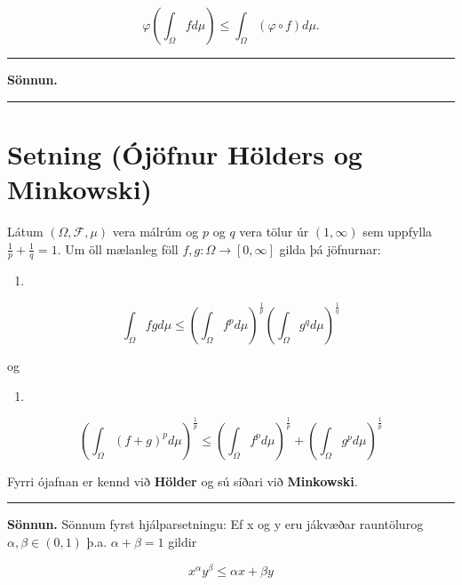 \documentclass[]{book}
\begin{document}
\[
\varphi\left(\int_\Omega fd\mu\right) \leq \int_\Omega (\varphi\circ f)d\mu.
\]

\begin{center}\rule{0.5\linewidth}{\linethickness}\end{center}

\textbf{Sönnun.}

\begin{center}\rule{0.5\linewidth}{\linethickness}\end{center}

\hypertarget{setning-ojofnur-holders-og-minkowski}{%
\section*{Setning (Ójöfnur Hölders og Minkowski)}\label{setning-ojofnur-holders-og-minkowski}}

Látum \((\Omega,\mathcal F,\mu)\) vera málrúm og \(p\) og \(q\) vera tölur úr \((1,\infty)\) sem uppfylla \(\frac1p + \frac1q = 1\). Um öll mælanleg föll \(f,g:\Omega\rightarrow[0,\infty]\) gilda þá jöfnurnar:

\begin{enumerate}
\def\labelenumi{\arabic{enumi}.}
\item
\end{enumerate}

\[
\int_\Omega fgd\mu \leq \left(\int_\Omega f^pd\mu\right)^{\frac1p}\left(\int_\Omega g^qd\mu\right)^{\frac1q}
\]

og

\begin{enumerate}
\def\labelenumi{\arabic{enumi}.}
\setcounter{enumi}{1}
\item
\end{enumerate}

\[
\left(\int_\Omega (f+g)^pd\mu\right)^\frac1p \leq
\left(\int_\Omega f^pd\mu\right)^{\frac1p} +
\left(\int_\Omega g^pd\mu\right)^{\frac1p}
\]

Fyrri ójafnan er kennd við \textbf{Hölder} og sú síðari við \textbf{Minkowski}.

\begin{center}\rule{0.5\linewidth}{\linethickness}\end{center}

\textbf{Sönnun.} Sönnum fyrst hjálparsetningu: Ef x og y eru jákvæðar rauntölurog \(\alpha,\beta\in(0,1)\) þ.a. \(\alpha+\beta=1\) gildir

\[
x^\alpha y^\beta\leq \alpha x + \beta y
\]
\end{document}
